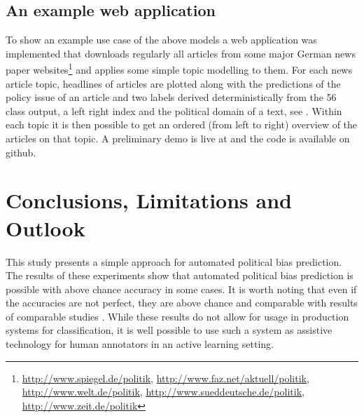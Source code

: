\documentclass[11pt]{article}
\begin{document}
\subsection{An example web application}
To show an example use case of the above models a web application was implemented that downloads regularly all articles from some major German news paper websites\footnote{\url{http://www.spiegel.de/politik}, \url{http://www.faz.net/aktuell/politik}, \url{http://www.welt.de/politik}, \url{http://www.sueddeutsche.de/politik}, \url{http://www.zeit.de/politik}} and applies some simple topic modelling to them. For each news article topic, headlines of articles are plotted along with the predictions of the policy issue of an article and two labels derived deterministically from the 56 class output, a left right index and the political domain of a text, see \cite{leftright}. Within each topic it is then possible to get an ordered (from left to right) overview of the articles on that topic. A preliminary demo is live at \cite{fipidemo} and the code is available on github\cite{fipi}.


\section{Conclusions, Limitations and Outlook}\label{sec:conclusion}
This study presents a simple approach for automated political bias prediction. The results of these experiments show that automated political bias prediction is possible with above chance accuracy in some cases. It is worth noting that even if the accuracies are not perfect, they are above chance and comparable with results of comparable studies \cite{Yu2008, Hirst2014}. While these results do not allow for usage in production systems for classification, it is well possible to use such a system as assistive technology for human annotators in an active learning setting.
\end{document}

